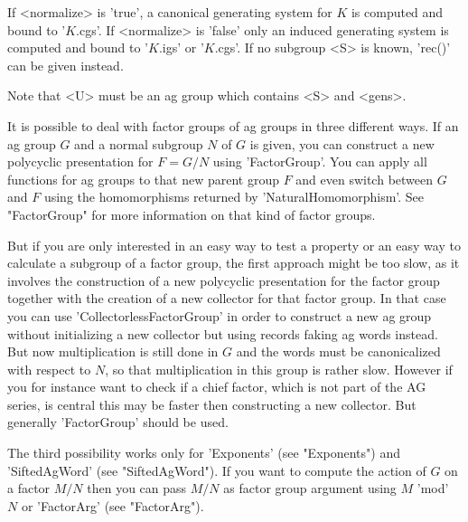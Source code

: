If   <normalize> is  'true', a  canonical  generating system   for $K$ is
computed and  bound  to '$K$.cgs'. If  <normalize>  is  'false'  only  an
induced generating  system   is  computed  and  bound  to  '$K$.igs'   or
'$K$.cgs'.  If no subgroup <S> is known, 'rec()' can be given instead.

Note that <U> must be an ag group which contains <S> and <gens>.



It is possible to deal with factor groups of ag groups in three different
ways.  If an ag group $G$ and a normal subgroup $N$ of $G$ is  given, you
can construct    a   new  polycyclic   presentation   for  $F=G/N$  using
'FactorGroup'.   You can apply all  functions for ag  groups to  that new
parent group $F$   and even switch between    $G$  and  $F$   using   the
homomorphisms  returned by 'NaturalHomomorphism'.   See "FactorGroup" for
more information on that kind of factor groups.

But if you are only interested  in an easy  way to test  a property or an
easy way to  calculate a subgroup of a  factor group,  the first approach
might be too slow, as  it  involves the construction  of a new polycyclic
presentation for  the factor  group together with the  creation of  a new
collector    for  that factor   group.     In  that  case  you  can   use
'CollectorlessFactorGroup' in order to  construct a  new ag group without
initializing a new  collector but using records  faking ag words instead.
But now multiplication   is still done in  $G$  and  the words   must  be
canonicalized with respect to  $N$, so  that multiplication in this group
is rather  slow. However if  you  for instance want to  check if  a chief
factor, which is not part of the AG series, is central this may be faster
then constructing a new collector. But  generally 'FactorGroup' should be
used.

The  third possibility works  only for 'Exponents' (see "Exponents")  and
'SiftedAgWord' (see "SiftedAgWord"). If you want to compute the action of
$G$ on a factor $M/N$  then  you can pass  $M/N$ as factor group argument
using $M$ 'mod' $N$ or 'FactorArg' (see "FactorArg").

%

